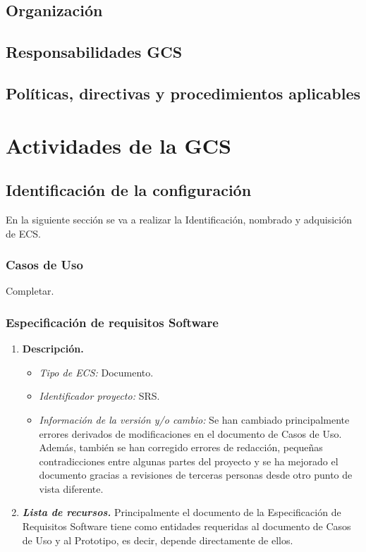 \documentclass[11pt, a4paper, twoside, titlepage]{article}
\begin{document}
		\subsection{Organización}
		\subsection{Responsabilidades GCS}
		\subsection{Políticas, directivas y procedimientos aplicables}
	\section{Actividades de la GCS}
		\subsection{Identificación de la configuración} %
			En la siguiente sección se va a realizar la Identificación, nombrado y adquisición de \gls{ECS}.

			\subsubsection{Casos de Uso}
				Completar.

			\subsubsection{Especificación de requisitos Software}

				\begin{enumerate}
					\item {\ithshape \bfseries Descripción.}
						\begin{itemize}
							\item \textit{Tipo de ECS:} Documento.
							\item \textit{Identificador proyecto:} SRS.
							\item \textit{Información de la versión y/o cambio:} Se han cambiado principalmente errores derivados de modificaciones en el documento de Casos de Uso. Además, también se han corregido errores de redacción, pequeñas contradicciones entre algunas partes del proyecto y se ha mejorado el documento gracias a revisiones de terceras personas desde otro punto de vista diferente.
						\end{itemize}

					\item {\itshape \bfseries Lista de recursos.}
						Principalmente el documento de la Especificación de Requisitos Software tiene como entidades requeridas al documento de Casos de Uso y al Prototipo, es decir, depende directamente de ellos.
				\end{enumerate}
\end{document}
